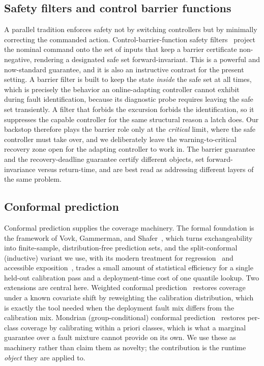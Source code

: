 \documentclass[journal]{IEEEtran}
\theoremstyle{plain}
\theoremstyle{definition}
\begin{document}
\subsection{Safety filters and control barrier functions} A parallel tradition enforces
safety not by switching controllers but by minimally correcting the commanded action.
Control-barrier-function safety filters~\cite{Ames2019} project the nominal command onto the
set of inputs that keep a barrier certificate non-negative, rendering a designated safe set
forward-invariant. This is a powerful and now-standard guarantee, and it is also an
instructive contrast for the present setting. A barrier filter is built to keep the state
\emph{inside} the safe set at all times, which is precisely the behavior an online-adapting
controller cannot exhibit during fault identification, because its diagnostic probe requires
leaving the safe set transiently. A filter that forbids the excursion forbids the
identification, so it suppresses the capable controller for the same structural reason a
latch does. Our backstop therefore plays the barrier role only at the \emph{critical} limit,
where the safe controller must take over, and we deliberately leave the warning-to-critical
recovery zone open for the adapting controller to work in. The barrier guarantee and the
recovery-deadline guarantee certify different objects, set forward-invariance versus
return-time, and are best read as addressing different layers of the same problem.

\subsection{Conformal prediction} Conformal prediction supplies the coverage machinery. The
formal foundation is the framework of Vovk, Gammerman, and Shafer~\cite{Vovk2005}, which
turns exchangeability into finite-sample, distribution-free prediction sets, and the
split-conformal (inductive) variant we use, with its modern treatment for
regression~\cite{Lei2018} and accessible exposition~\cite{Angelopoulos2023}, trades a small
amount of statistical efficiency for a single held-out calibration pass and a deployment-time
cost of one quantile lookup. Two extensions are central here. Weighted conformal
prediction~\cite{Tibshirani2019} restores coverage under a known covariate shift by
reweighting the calibration distribution, which is exactly the tool needed when the
deployment fault mix differs from the calibration mix. Mondrian (group-conditional) conformal
prediction~\cite{Vovk2005} restores per-class coverage by calibrating within a priori
classes, which is what a marginal guarantee over a fault mixture cannot provide on its own.
We use these as machinery rather than claim them as novelty; the contribution is the runtime
\emph{object} they are applied to.
\end{document}
